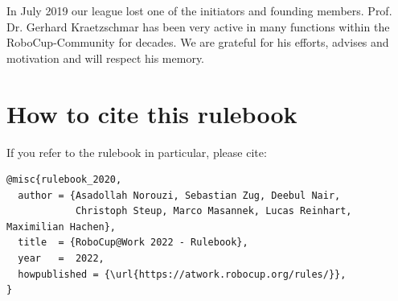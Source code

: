 \begin{titlepage}
In July 2019 our league lost one of the initiators and founding members. Prof. Dr. Gerhard
Kraetzschmar has been very active in many functions within the RoboCup-Community
for decades. We are grateful for his efforts, advises and motivation and will respect his memory.

\section*{How to cite this rulebook}

If you refer to the rulebook in particular, please cite:

\begin{verbatim}
@misc{rulebook_2020,
  author = {Asadollah Norouzi, Sebastian Zug, Deebul Nair,
            Christoph Steup, Marco Masannek, Lucas Reinhart, Maximilian Hachen},
  title  = {RoboCup@Work 2022 - Rulebook},
  year   =  2022,
  howpublished = {\url{https://atwork.robocup.org/rules/}},
}
\end{verbatim}

\end{titlepage}
